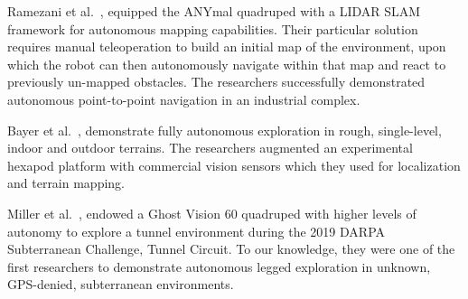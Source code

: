 \documentclass[letterpaper, 10pt, conference]{ieeeconf}      %
\newcommand{\rev}[1]{{\color{blue} #1 }} %
\begin{document}
\rev{Ramezani et al.~\cite{Ramezani2020}, equipped the ANYmal quadruped with a LIDAR SLAM framework for autonomous mapping capabilities. Their particular solution requires manual teleoperation to build an initial map of the environment, upon which the robot can then autonomously navigate within that map and react to previously un-mapped obstacles. 
The researchers successfully demonstrated autonomous point-to-point navigation in an industrial complex.

Bayer et al.~\cite{Bayer2019}, demonstrate fully autonomous exploration in rough, single-level, indoor and outdoor terrains.
The researchers augmented an experimental hexapod platform with commercial vision sensors which they used for localization and terrain mapping.

Miller et al.~\cite{miller2019tunnel}, 
endowed a Ghost Vision 60 quadruped with higher levels of autonomy to explore a tunnel environment during the 2019 DARPA Subterranean Challenge, Tunnel Circuit. To our knowledge, they were one of the first researchers to demonstrate  
autonomous legged exploration in unknown, GPS-denied, subterranean environments.} %
\end{document}
